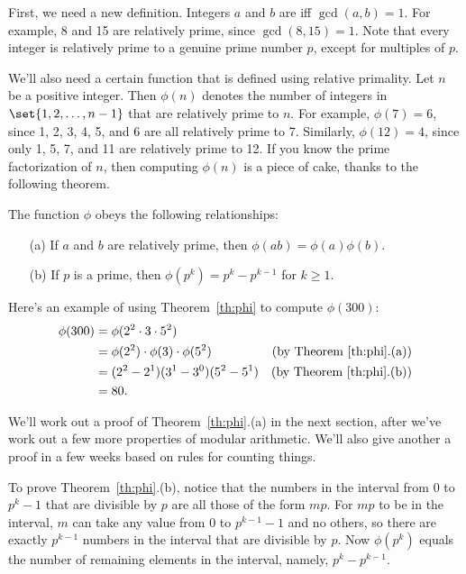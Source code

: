 First, we need a new definition.  Integers $a$ and $b$ are
 iff $\gcd(a, b) = 1$.  For example, 8 and 15
are relatively prime, since $\gcd(8, 15) = 1$.  Note that every
integer is relatively prime to a genuine prime number $p$, except for
multiples of $p$.

We'll also need a certain function that is defined using relative
primality.  Let $n$ be a positive integer.  Then $\phi(n)$ denotes the
number of integers in $\set{1, 2, \dots, n - 1}$ that are relatively
prime to $n$.  For example, $\phi(7) = 6$, since 1, 2, 3, 4, 5, and 6
are all relatively prime to 7.  Similarly, $\phi(12) = 4$, since only
1, 5, 7, and 11 are relatively prime to 12.  If you know the prime
factorization of $n$, then computing $\phi(n)$ is a piece of cake,
thanks to the following theorem.

\begin{theorem}
\label{th:phi}
The function $\phi$ obeys the following relationships:
\begin{enumerate}
\item[(a)] If $a$ and $b$ are relatively prime, then $\phi(ab) = \phi(a)\phi(b)$.
\item[(b)] If $p$ is a prime, then $\phi(p^k) = p^k - p^{k-1}$ for $k \geq 1$.
\end{enumerate}
\end{theorem}

Here's an example of using Theorem~\ref{th:phi} to compute $\phi(300)$:
%
\begin{align*}
\phi(300)
    & = \phi(2^2 \cdot 3 \cdot 5^2)\\
    & = \phi(2^2) \cdot \phi(3) \cdot \phi(5^2)
            & \text{(by Theorem~\ref{th:phi}.(a))}\\
    & = (2^2 - 2^1) (3^1 - 3^0) (5^2 - 5^1) 
            & \text{(by Theorem~\ref{th:phi}.(b))}\\
    & = 80.
\end{align*}

We'll work out a proof of Theorem~\ref{th:phi}.(a) in the next
section, after we've work out a few more properties of modular arithmetic.
We'll also give another a proof in a few weeks based on rules for counting
things.

To prove Theorem~\ref{th:phi}.(b), notice that the numbers in the interval
from 0 to $p^{k}-1$ that are divisible by $p$ are all those of the form
$mp$.  For $mp$ to be in the interval, $m$ can take any value from 0 to
$p^{k-1}-1$ and no others, so there are exactly $p^{k-1}$ numbers in the
interval that are divisible by $p$.  Now $\phi(p^{k})$ equals the number
of remaining elements in the interval, namely, $p^k -p^{k-1}$.


